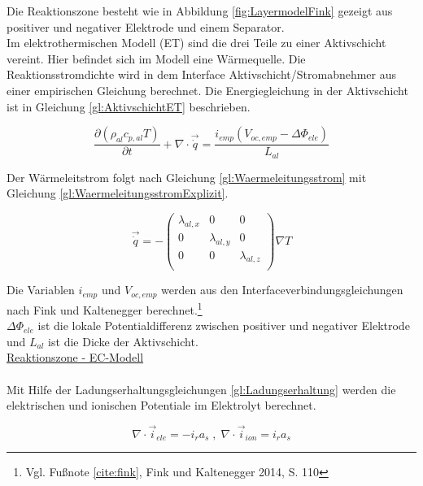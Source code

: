 Die Reaktionszone besteht wie in Abbildung \ref{fig:LayermodelFink} gezeigt aus positiver und negativer Elektrode und einem Separator. \\
Im elektrothermischen Modell (ET) sind die drei Teile zu einer Aktivschicht vereint. Hier befindet sich im Modell eine Wärmequelle. Die Reaktionsstromdichte wird in dem Interface Aktivschicht/Stromabnehmer aus einer empirischen Gleichung berechnet. Die Energiegleichung in der Aktivschicht ist in Gleichung \ref{gl:AktivschichtET} beschrieben.

\begin{equation}
	\frac{\partial (\rho_{al} c_{p,al} T)}{\partial t} + \nabla \cdot \vec{\dot{q}} = \frac{i_{emp} ( V_{oc,emp} - \Delta \Phi_{ele} )}{L_{al}} \label{gl:AktivschichtET}
\end{equation} 

Der Wärmeleitstrom folgt nach Gleichung \ref{gl:Waermeleitungsstrom} mit Gleichung \ref{gl:WaermeleitungsstromExplizit}.

\begin{equation}
	\vec{\dot{q}} = - \left( \begin{array}{ccc} \lambda_{al,x} & 0 & 0\\ 0 & \lambda_{al,y} & 0 \\ 0 & 0 & \lambda_{al,z}\\ \end{array} \right) \nabla T \label{gl:WaermeleitungsstromExplizit}
\end{equation}
 
Die Variablen $i_{emp}$ und $V_{oc,emp}$ werden aus den Interfaceverbindungsgleichungen nach Fink und Kaltenegger berechnet.\footnote{Vgl. Fußnote \ref{cite:fink}, Fink und Kaltenegger 2014,  S. 110}\\
$\Delta \Phi_{ele}$ ist die lokale Potentialdifferenz zwischen positiver und negativer Elektrode und $L_{al}$ ist die Dicke der Aktivschicht.\\
 
\underline{Reaktionszone - EC-Modell}\\
\\

Mit Hilfe der Ladungserhaltungsgleichungen \ref{gl:Ladungserhaltung} werden die elektrischen und ionischen Potentiale im Elektrolyt berechnet.

\begin{equation}
	\nabla \cdot \vec{i}_{ele} = - i_{r} a_{s} \; , \; \nabla \cdot \vec{i}_{ion} = i_{r} a_{s} \label{gl:Ladungserhaltung}
\end{equation}

